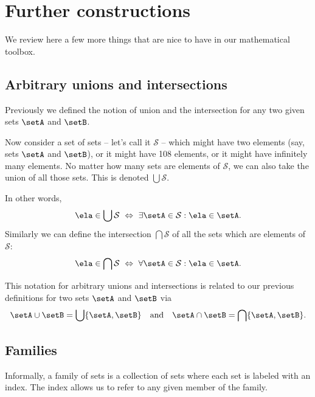 
\section{Further constructions}
\label{sec:more-constructions}

We review here a few more things that are nice to have in our mathematical toolbox.

\subsection{Arbitrary unions and intersections}

Previously we defined the notion of union and the intersection for any two given sets $\setA$ and $\setB$.

Now consider a set of sets -- let's call it $\mathcal{S}$ -- which might have two elements (say, sets $\setA$ and $\setB$), or it might have 108 elements, or it might have infinitely many elements.
No matter how many sets are elements of $\mathcal{S}$, we can also take the union of all those sets.
This is denoted $\bigcup \mathcal{S}$.

In other words,
%
\begin{equation*}
    \ela \in \bigcup \mathcal{S}  \ \Leftrightarrow \ \exists \setA \in \mathcal{S} : \ela \in \setA.
\end{equation*}
%
Similarly we can define the intersection $\bigcap \mathcal{S}$ of all the sets which are elements of $\mathcal{S}$:
%
\begin{equation*}
    \ela \in \bigcap \mathcal{S} \ \Leftrightarrow \  \forall \setA \in \mathcal{S} : \ela \in \setA.
\end{equation*}

This notation for arbitrary unions and intersections is related to our previous definitions for two sets $\setA$ and $\setB$ via
\begin{equation}
    \setA \cup \setB = \bigcup \{ \setA, \setB \} \quad \text{and} \quad \setA \cap \setB = \bigcap \{ \setA, \setB \}.
\end{equation}

\subsection{Families}

Informally, a family of sets is a collection of sets where each set is labeled with an index.
The index allows us to refer to any given member of the family.

